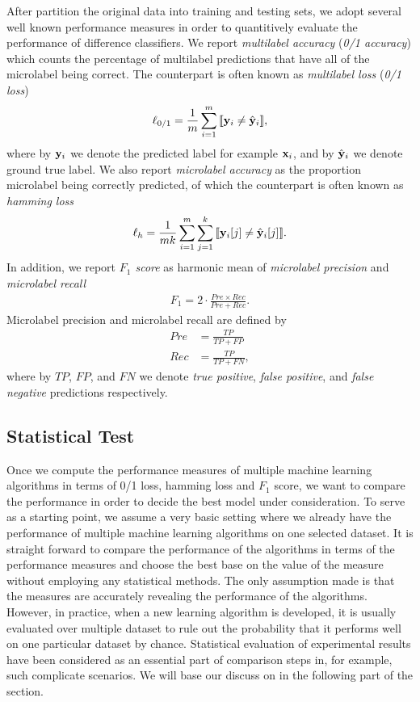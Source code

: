 {After partition the original data into training and testing sets, we adopt several well known performance measures in order to quantitively evaluate the performance of difference classifiers.
We report \textit{multilabel accuracy} (\textit{0/1 accuracy}) which counts the percentage of multilabel predictions that have all of the microlabel being correct.
The counterpart is often known as \textit{multilabel loss} (\textit{0/1 loss})
\begin{align*}
	\ell_{0/1} = \frac{1}{m}\sum_{i=1}^{m}{\llbracket \mathbf {y}_i \neq \hat{\mathbf {y}}_i \rrbracket},
\end{align*}
where by $\mathbf {y}_i$ we denote the predicted label for example $\mathbf {x}_i$, and by $\hat{\mathbf {y}}_i$ we denote ground true label.
We also report \textit{microlabel accuracy} as the proportion microlabel being correctly predicted, of which the counterpart is often known as \textit{hamming loss}
\begin{align*}
	\ell_{h} = \frac{1}{mk}\sum_{i=1}^{m}\sum_{j=1}^{k}{\llbracket \mathbf {y}_i[j] \neq \hat{\mathbf {y}}_i[j] \rrbracket}.
\end{align*}
In addition, we report \textit{$F_1$ score} as harmonic mean of \textit{microlabel precision} and \textit{microlabel recall}
\begin{align*}
	F_1 = 2\cdot\frac{Pre\times Rec}{Pre+Rec}.
\end{align*}
Microlabel precision and microlabel recall are defined by
\begin{align*}
	Pre &= \frac{TP}{TP+FP}\\
	Rec &= \frac{TP}{TP+FN},
\end{align*}
where by $TP$, $FP$, and $FN$ we denote \textit{true positive}, \textit{false positive}, and \textit{false negative} predictions respectively.

%
%
\subsection{Statistical Test}

Once we compute the performance measures of multiple machine learning algorithms in terms of 0/1 loss, hamming loss and $F_1$ score, we want to compare the performance in order to decide the best model under consideration. 
To serve as a starting point, we assume a very basic setting where we already have the performance of multiple machine learning algorithms on one selected dataset.
It is straight forward to compare the performance of the algorithms in terms of the performance measures and choose the best base on the value of the measure without employing any statistical methods.
The only assumption made is that the measures are accurately revealing the performance of the algorithms.
However, in practice, when a new learning algorithm is developed, it is usually evaluated over multiple dataset to rule out the probability that it performs well on one particular dataset by chance.
Statistical evaluation of experimental results have been considered as an essential part of comparison steps in, for example, such complicate scenarios.
We will base our discuss on \citep{Demsar06statistical,Garcia08an} in the following part of the section.

}
